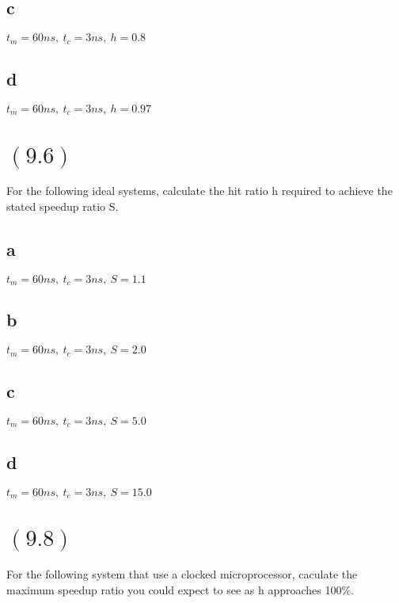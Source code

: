 \documentclass[letterpaper,12pt,titlepage]{article}
\begin{document}
\subsection*{c} $t_m=60ns,~t_c=3ns,~h=0.8$
\begin{mdframed}[style=MyFrame]
\end{mdframed}
\subsection*{d} $t_m=60ns,~t_c=3ns,~h=0.97$
\begin{mdframed}[style=MyFrame]
\end{mdframed}

\section*{$(9.6)$} For the following ideal systems, calculate the hit ratio h required to achieve the stated speedup ratio S.

\subsection*{a} $t_m=60ns,~t_c=3ns,~S=1.1$
\begin{mdframed}[style=MyFrame]
\end{mdframed}
\subsection*{b} $t_m=60ns,~t_c=3ns,~S=2.0$
\begin{mdframed}[style=MyFrame]
\end{mdframed}
\subsection*{c} $t_m=60ns,~t_c=3ns,~S=5.0$
\begin{mdframed}[style=MyFrame]
\end{mdframed}
\subsection*{d} $t_m=60ns,~t_c=3ns,~S=15.0$
\begin{mdframed}[style=MyFrame]
\end{mdframed}

\section*{$(9.8)$} For the following system that use a clocked microprocessor, caculate the maximum speedup ratio you could expect to see as h approaches 100\%.
\end{document}
